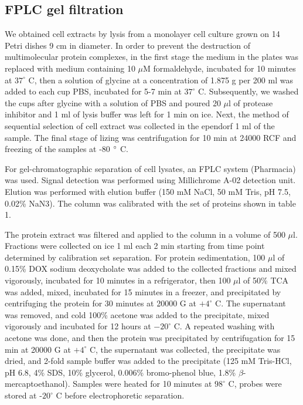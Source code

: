 \documentclass[alpha-refs]{wiley-article}
\begin{document}
\subsection{FPLC gel filtration}

We obtained cell extracts by lysis from a monolayer cell culture grown on 14 Petri dishes 9 cm in diameter.
In order to prevent the destruction of multimolecular protein complexes, in the first stage the medium in the plates was replaced with medium containing 10 $\mu$M formaldehyde, incubated for 10 minutes at $37^{\circ}$ C, then a solution of glycine at a concentration of 1.875 g per 200 ml was added to each cup PBS, incubated for 5-7 min at  $37^{\circ}$  C. Subsequently, we washed the cups after glycine with a solution of PBS and poured 20 $\mu$l of protease inhibitor and 1 ml of lysis buffer was left for 1 min on ice.
Next, the method of sequential selection of cell extract was collected in the ependorf 1 ml of the sample. The final stage of lizing was centrifugation for 10 min at 24000 RCF and freezing of the samples at -80 $\degree$ C.


For gel-chromatographic separation of cell lysates, an FPLC system (Pharmacia) was used.
Signal detection was performed using Millichrome A-02 detection unit.
Elution was performed with elution buffer (150 mM NaCl, 50 mM Tris, pH 7.5, 0.02\% NaN3).
The column was calibrated with the set of proteins shown in table 1.


The protein extract was filtered and applied to the column in a volume of 500 $\mu$l.
Fractions were collected on ice 1 ml each 2 min starting from time point determined by calibration set separation.
For protein sedimentation, 100 $\mu$l of 0.15\% DOX sodium deoxycholate was added to the collected fractions and mixed vigorously, incubated for 10 minutes in a refrigerator, then 100 $\mu$l of 50\% TCA was added, mixed, incubated for 15 minutes in a freezer, and precipitated by centrifuging the protein for 30 minutes at 20000 G at $+4^{\circ}$ C.
The supernatant was removed, and cold 100\% acetone was added to the precipitate, mixed vigorously and incubated for 12 hours at $-20^{\circ}$ C.
A repeated washing with acetone was done, and then the protein was precipitated by centrifugation for 15 min at 20000 G at $+4^{\circ}$ C, the supernatant was collected, the precipitate was dried, and 2-fold sample buffer was added to the precipitate (125 mM Tris-HCl, pH 6.8, 4\% SDS, 10\% glycerol, 0.006\% bromo-phenol blue, 1.8\% $\beta$-mercaptoethanol).
Samples were heated for 10 minutes at $98^{\circ}$ C, probes were stored at -$20^{\circ}$ C before electrophoretic separation.
\end{document}
